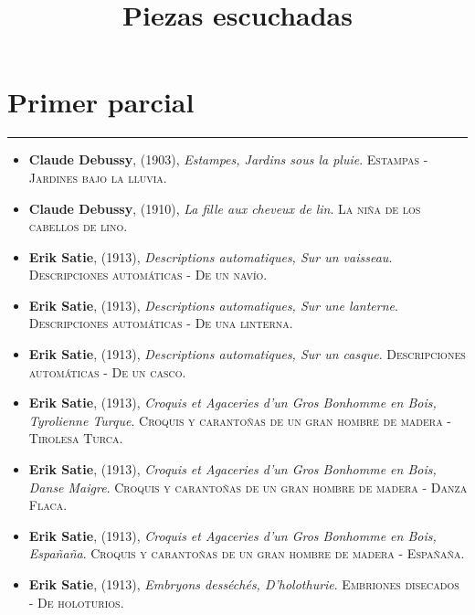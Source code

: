 \documentclass[paper=a4, fontsize=11pt, spanish]{scrartcl}
\date{}
\title{	
\normalfont \normalsize 
\huge  Piezas escuchadas \\
\horrule{2pt}
}
\numberwithin{equation}{section} %
\numberwithin{figure}{section} %
\numberwithin{table}{section} %
\newcommand{\horrule}[1]{\rule{\linewidth}{#1}}
\begin{document}
\maketitle
\section{Primer parcial}
\horrule{0.5pt}

\begin{itemize}

\item \textbf{Claude Debussy}, (1903), \textit{Estampes, Jardins sous la pluie}.\textsc{ Estampas - Jardines bajo la lluvia}. %
\item \textbf{Claude Debussy}, (1910), \textit{La fille aux cheveux de lin}.\textsc{ La niña de los cabellos de lino}. %
\item \textbf{Erik Satie}, (1913), \textit{Descriptions automatiques, Sur un vaisseau}. \textsc{ Descripciones automáticas - De un navío}. %
\item \textbf{Erik Satie}, (1913), \textit{Descriptions automatiques, Sur une lanterne}.\textsc{ Descripciones automáticas - De una linterna}. %
\item \textbf{Erik Satie}, (1913), \textit{Descriptions automatiques, Sur un casque}.\textsc{ Descripciones automáticas - De un casco}. %
\item \textbf{Erik Satie}, (1913), \textit{Croquis et Agaceries d'un Gros Bonhomme en Bois, Tyrolienne Turque}. \textsc{ Croquis y carantoñas de un gran hombre de madera - Tirolesa Turca}. %
\item \textbf{Erik Satie}, (1913), \textit{Croquis et Agaceries d'un Gros Bonhomme en Bois, Danse Maigre}. \textsc{ Croquis y carantoñas de un gran hombre de madera - Danza Flaca}. %
\item \textbf{Erik Satie}, (1913), \textit{Croquis et Agaceries d'un Gros Bonhomme en Bois, Españaña}. \textsc{ Croquis y carantoñas de un gran hombre de madera - Españaña}. %
\item \textbf{Erik Satie}, (1913), \textit{Embryons desséchés, D'holothurie}.\textsc{ Embriones disecados - De holoturios}. %

\end{itemize}
\end{document}
